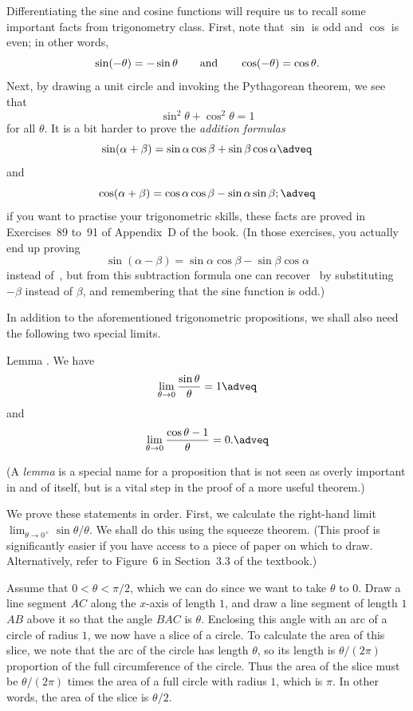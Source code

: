 Differentiating the sine and cosine functions will require us to recall some important facts from trigonometry
class. First, note that $\sin$ is odd and $\cos$ is even; in other words,
$$\sin(-\theta) = -\sin\theta \qquad\hbox{and}\qquad \cos(-\theta) = \cos\theta.$$
Next, by drawing a unit circle and invoking the Pythagorean theorem, we see that
$$\sin^2\theta + \cos^2\theta = 1$$
for all $\theta$.
It is a bit harder to prove the {\it addition formulas}
\edef\eqsinaddition{\the\eqcount}
$$\sin(\alpha + \beta) = \sin\alpha\cos\beta + \sin\beta\cos\alpha\adveq$$
and
\edef\eqcosaddition{\the\eqcount}
$$\cos(\alpha + \beta) = \cos\alpha\cos\beta - \sin\alpha\sin\beta;\adveq$$
if you want to practise your trigonometric skills, these facts are
proved in Exercises~89 to~91 of Appendix~D of the book. (In those exercises, you actually end up proving
$$\sin(\alpha - \beta) = \sin\alpha\cos\beta - \sin\beta\cos\alpha$$
instead of~\refeq{\eqsinaddition},
but from this subtraction formula one can recover~\refeq{\eqsinaddition} by substituting $-\beta$ instead
of $\beta$, and remembering that the sine function is odd.)

In addition to the aforementioned trigonometric propositions, we shall also need the following two
special limits.

\edef\lemtrigspeciallimits{\the\thmcount}
\proclaim Lemma \advthm. We have
\global\edef\eqsinspecial{\the\eqcount}
$$\lim_{\theta\to 0} {\sin\theta \over\theta} = 1\adveq$$
and
\global\edef\eqcosspecial{\the\eqcount}
$$\lim_{\theta\to 0} {\cos\theta - 1\over \theta} = 0.\adveq$$

(A {\it lemma} is a special name for a proposition that is not seen as overly important in and of itself,
but is a vital step in the proof of a more useful theorem.)

\proof We prove these statements in order. First, we calculate the right-hand limit $\lim_{\theta\to 0^+}
\sin \theta / \theta$. We shall do this using the squeeze theorem.
(This proof is significantly easier if you have access to a piece of paper
on which to draw. Alternatively, refer to Figure~6 in Section~3.3 of the textbook.)

Assume that $0<\theta<\pi/2$, which we can do since we want to take $\theta$ to $0$.
Draw a line segment $AC$ along the $x$-axis of length $1$, and draw a line segment of length $1$
$AB$ above it so that the angle $BAC$ is $\theta$.
Enclosing this angle with an arc of a circle of radius $1$, we now have a slice of a circle.
To calculate the area of this slice, we note that the arc of the circle has length $\theta$, so its length
is $\theta/(2\pi)$ proportion of the full circumference of the circle. Thus the area of the slice must be
$\theta/(2\pi)$ times the area of a full circle with radius $1$, which is $\pi$. In other words, the
area of the slice is $\theta/2$.

